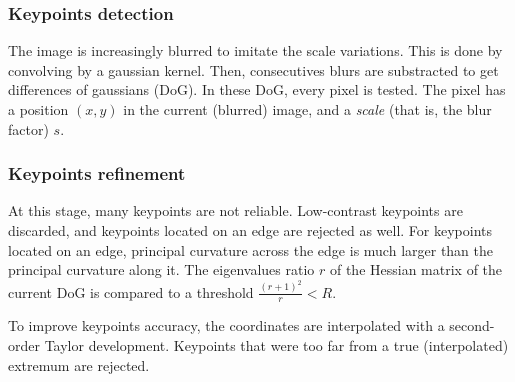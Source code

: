 \documentclass[preprint]{iucr}
\begin{document}
\subsubsection{Keypoints detection}
The image is increasingly blurred to imitate the scale variations. This is done by convolving by a gaussian kernel. Then, consecutives blurs are substracted to get differences of gaussians (DoG). In these DoG, every pixel is tested. The pixel has a position $(x,y)$ in the current (blurred) image, and a \textit{scale} (that is, the blur factor) $s$.


\subsubsection{Keypoints refinement}
At this stage, many keypoints are not reliable. Low-contrast keypoints are discarded, and keypoints located on an edge are rejected as well. For keypoints located on an edge, principal curvature across the edge is much larger than the principal curvature along it. The eigenvalues ratio $r$ of the Hessian matrix of the current DoG is compared to a threshold $\frac{(r+1)^2}{r} < R$.

To improve keypoints accuracy, the coordinates are interpolated with a second-order Taylor development.
Keypoints that were too far from a true (interpolated) extremum are rejected.
\end{document}
